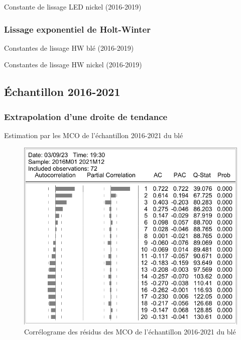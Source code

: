\documentclass[12pt,a4paper]{article}
\begin{document}
\begin{table}[H]
    \centering
    \caption{Constante de lissage LED nickel (2016-2019)}
    \sffamily
    
    \label{tab:led_nickel19}
\end{table}

\subsubsection{Lissage exponentiel de Holt-Winter}
\begin{table}[H]
    \centering
    \caption{Constantes de lissage HW blé (2016-2019)}
    \sffamily
    
    \label{tab:hwout_ble19}
\end{table}
\begin{table}[H]
    \centering
    \caption{Constantes de lissage HW nickel (2016-2019)}
    \sffamily
    
    \label{tab:hwout_nickel19}
\end{table}


\subsection{Échantillon 2016-2021}
\subsubsection{Extrapolation d'une droite de tendance}
\begin{table}[H]
    \centering
    \caption{Estimation par les MCO de l'échantillon 2016-2021 du blé}
    \sffamily
    \label{tab:mco_ble21}
    
\end{table}

\begin{figure}[H]
    \centering
    \label{fig:mco_cor_ble21}
    \includegraphics[]{annexe/3_2_mco_corr_ble.pdf}
    \caption{Corrélograme des résidus des MCO de l'échantillon 2016-2021 du blé}
\end{figure}
\end{document}
